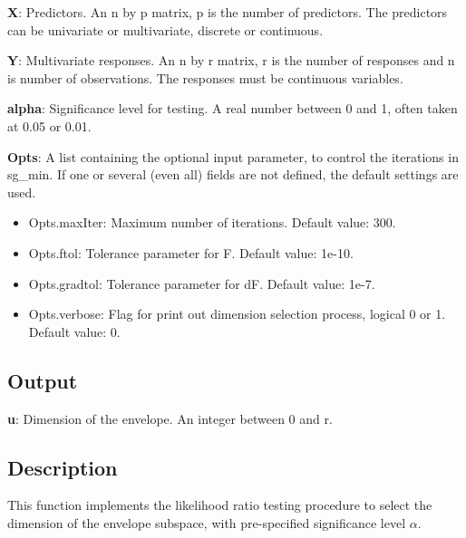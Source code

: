 \documentclass[a4paper,11pt,openany]{memoir}
\begin{document}
\begin{par}
\textbf{X}: Predictors. An n by p matrix, p is the number of predictors. The predictors can be univariate or multivariate, discrete or continuous.
\end{par} \vspace{1em}
\begin{par}
\textbf{Y}: Multivariate responses. An n by r matrix, r is the number of responses and n is number of observations. The responses must be continuous variables.
\end{par} \vspace{1em}
\begin{par}
\textbf{alpha}: Significance level for testing.  A real number between 0 and 1, often taken at 0.05 or 0.01.
\end{par} \vspace{1em}
\begin{par}
\textbf{Opts}: A list containing the optional input parameter, to control the iterations in sg\_min. If one or several (even all) fields are not defined, the default settings are used.
\end{par} \vspace{1em}
\begin{itemize}
\setlength{\itemsep}{-1ex}
   \item Opts.maxIter: Maximum number of iterations.  Default value: 300.
   \item Opts.ftol: Tolerance parameter for F.  Default value: 1e-10.
   \item Opts.gradtol: Tolerance parameter for dF.  Default value: 1e-7.
   \item Opts.verbose: Flag for print out dimension selection process, logical 0 or 1. Default value: 0.
\end{itemize}


\subsection*{Output}

\begin{par}
\textbf{u}: Dimension of the envelope. An integer between 0 and r.
\end{par} \vspace{1em}


\subsection*{Description}

\begin{par}
This function implements the likelihood ratio testing procedure to select the dimension of the envelope subspace, with pre-specified significance level $\alpha$.
\end{par} \vspace{1em}
\end{document}
